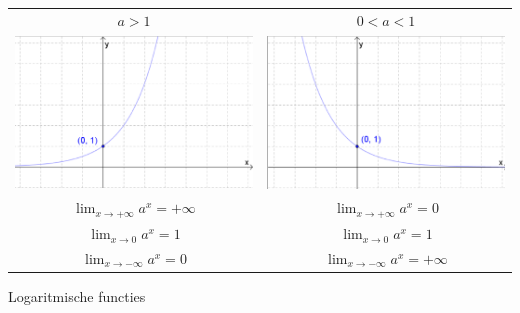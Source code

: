 \begin{tabel*}{}
	\centering
	\begin{tabular}{c|c}
		$a>1$ &  $0<a<1$\\
		\includegraphics[width=7cm]{2_elem_rekenvaardigheden_B/inputs/expagroter1.eps} & 
		\includegraphics[width=7cm]{2_elem_rekenvaardigheden_B/inputs/expakleiner1.eps}\\
		$\lim_{x\to+\infty}a^{x}=+\infty$ &  $\lim_{x\to+\infty}a^{x}=0$\\
		$\lim_{x\to0}a^{x}=1$ &  $\lim_{x\to0}a^{x}=1$\\
		$\lim_{x\to-\infty}a^{x}=0$ &  $\lim_{x\to-\infty}a^{x}=+\infty$\\
	\end{tabular}
\end{tabel*}

Logaritmische functies

